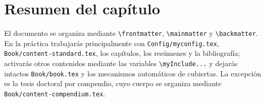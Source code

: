 \section{Resumen del capítulo}
\label{sec:resumen-estructura-documento}

El documento se organiza mediante \texttt{\textbackslash{}frontmatter}, \texttt{\textbackslash{}mainmatter} y \texttt{\textbackslash{}backmatter}. En la práctica trabajarás principalmente con \texttt{Config/myconfig.tex}, \texttt{Book/content-standard.tex}, los capítulos, los resúmenes y la bibliografía; activarás otros contenidos mediante las variables \texttt{\textbackslash{}myInclude...} y dejarás intactos \texttt{Book/book.tex} y los mecanismos automáticos de cubiertas. La excepción es la tesis doctoral por compendio, cuyo cuerpo se organiza mediante \texttt{Book/content-compendium.tex}.








